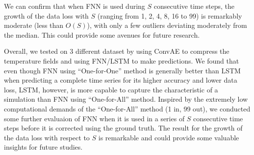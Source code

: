 We can confirm that when FNN is used during $S$ consecutive time steps, the growth of the data loss with $S$ (ranging from 1, 2, 4, 8, 16 to 99) is remarkably moderate (less than $O(S)$), with only a few outliers deviating moderately from the median. This could provide some avenues for future research.

Overall, we tested on 3 different dataset by using ConvAE to compress the temperature fields and using FNN/LSTM to make predictions. We found that even though FNN using ``One-for-One'' method is generally better than LSTM when predicting a complete time series for its higher accuracy and lower data loss, LSTM, however, is more capable to capture the characteristic of a simulation than FNN using ``One-for-All'' method. Inspired by the extremely low computational demands of the ``One-for-All'' method (1 in, 99 out), we conducted some further evaluaion of FNN when it is used in a series of $S$ consecutive time steps before it is corrected using the ground truth. The result for the growth of the data loss with respect to $S$ is remarkable and could provide some valuable insights for future studies.




